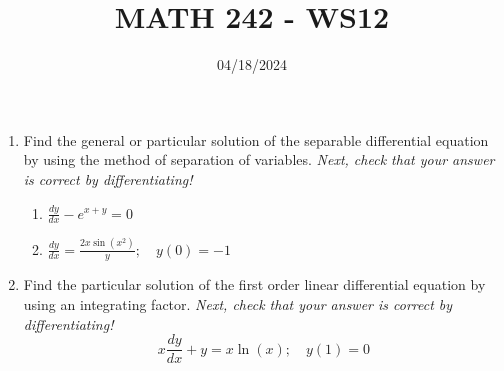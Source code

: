 \documentclass[12pt]{article}
\title{MATH 242 - WS12}
\date{04/18/2024}
\begin{document}
\maketitle


\begin{enumerate}




\item Find the general or particular solution of the separable differential equation by using the method of separation of variables. \emph{Next, check that your answer is correct by differentiating!}
\begin{enumerate}
    \item $\frac{dy}{dx}-e^{x+y}=0$
    \newpage
    \item $\frac{dy}{dx}=\frac{2x\sin(x^2)}{y};\quad y(0)=-1$
    \newpage
\end{enumerate}

\item Find the particular solution of the first order linear differential equation by using an integrating factor. \emph{Next, check that your answer is correct by differentiating!}
$$x\frac{dy}{dx}+y=x\ln(x);\quad y(1)=0$$


\end{enumerate}
\end{document}

